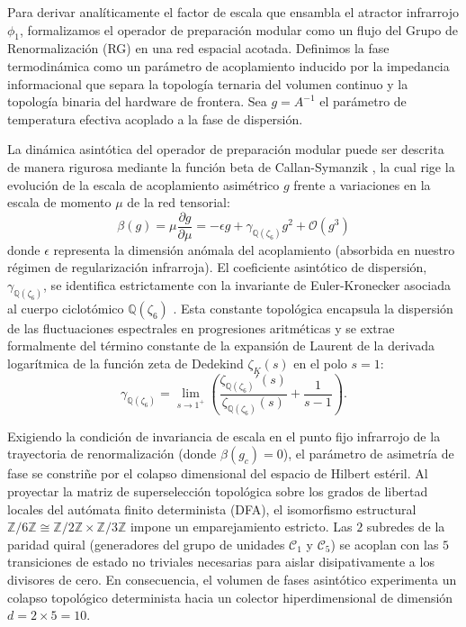 \documentclass[12pt,a4paper]{article}
\theoremstyle{plain}
\theoremstyle{definition}
\theoremstyle{remark}
\begin{document}
Para derivar analíticamente el factor de escala que ensambla el atractor infrarrojo $\phi_1$, formalizamos el operador de preparación modular como un flujo del Grupo de Renormalización (RG) en una red espacial acotada. Definimos la fase termodinámica como un parámetro de acoplamiento inducido por la impedancia informacional que separa la topología ternaria del volumen continuo y la topología binaria del hardware de frontera. Sea $g = A^{-1}$ el parámetro de temperatura efectiva acoplado a la fase de dispersión. 

La dinámica asintótica del operador de preparación modular puede ser descrita de manera rigurosa mediante la función beta de Callan-Symanzik \cite{Callan1970}, la cual rige la evolución de la escala de acoplamiento asimétrico $g$ frente a variaciones en la escala de momento $\mu$ de la red tensorial:
\begin{equation}
\beta(g) = \mu \frac{\partial g}{\partial \mu} = -\epsilon g + \gamma_{\mathbb{Q}(\zeta_6)} g^2 + \mathcal{O}(g^3)
\label{eq:beta_function}
\end{equation}
donde $\epsilon$ representa la dimensión anómala del acoplamiento (absorbida en nuestro régimen de regularización infrarroja). El coeficiente asintótico de dispersión, $\gamma_{\mathbb{Q}(\zeta_6)}$, se identifica estrictamente con la invariante de Euler-Kronecker asociada al cuerpo ciclotómico $\mathbb{Q}(\zeta_6)$ \cite{Ihara2006}. Esta constante topológica encapsula la dispersión de las fluctuaciones espectrales en progresiones aritméticas y se extrae formalmente del término constante de la expansión de Laurent de la derivada logarítmica de la función zeta de Dedekind $\zeta_K(s)$ en el polo $s=1$:
\begin{equation}
\gamma_{\mathbb{Q}(\zeta_6)} = \lim_{s\to 1^+} \left( \frac{\zeta_{\mathbb{Q}(\zeta_6)}'(s)}{\zeta_{\mathbb{Q}(\zeta_6)}(s)} + \frac{1}{s-1} \right).
\end{equation}

Exigiendo la condición de invariancia de escala en el punto fijo infrarrojo de la trayectoria de renormalización (donde $\beta(g_c) = 0$), el parámetro de asimetría de fase se constriñe por el colapso dimensional del espacio de Hilbert estéril. Al proyectar la matriz de superselección topológica sobre los grados de libertad locales del autómata finito determinista (DFA), el isomorfismo estructural $\mathbb{Z}/6\mathbb{Z} \cong \mathbb{Z}/2\mathbb{Z} \times \mathbb{Z}/3\mathbb{Z}$ impone un emparejamiento estricto. Las $2$ subredes de la paridad quiral (generadores del grupo de unidades $\mathcal{C}_1$ y $\mathcal{C}_5$) se acoplan con las $5$ transiciones de estado no triviales necesarias para aislar disipativamente a los divisores de cero. En consecuencia, el volumen de fases asintótico experimenta un colapso topológico determinista hacia un colector hiperdimensional de dimensión $d = 2 \times 5 = 10$.
\end{document}
